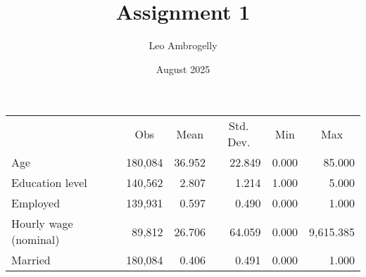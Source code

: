 \documentclass{article}
\title{Assignment 1}
\author{Leo Ambrogelly}
\date{August 2025}
\begin{document}
\maketitle

\begin{table}[!h]
\centering
\begin{tabular}{llllll}
\cline{1-6}
\multicolumn{1}{r}{} &
  \multicolumn{1}{c}{Obs} &
  \multicolumn{1}{c}{Mean} &
  \multicolumn{1}{c}{Std. Dev.} &
  \multicolumn{1}{c}{Min} &
  \multicolumn{1}{c}{Max} \\
\cline{1-6}
\multicolumn{1}{l}{Age} &
  \multicolumn{1}{r}{180,084} &
  \multicolumn{1}{r}{36.952} &
  \multicolumn{1}{r}{22.849} &
  \multicolumn{1}{r}{0.000} &
  \multicolumn{1}{r}{85.000} \\
\multicolumn{1}{l}{Education level} &
  \multicolumn{1}{r}{140,562} &
  \multicolumn{1}{r}{2.807} &
  \multicolumn{1}{r}{1.214} &
  \multicolumn{1}{r}{1.000} &
  \multicolumn{1}{r}{5.000} \\
\multicolumn{1}{l}{Employed} &
  \multicolumn{1}{r}{139,931} &
  \multicolumn{1}{r}{0.597} &
  \multicolumn{1}{r}{0.490} &
  \multicolumn{1}{r}{0.000} &
  \multicolumn{1}{r}{1.000} \\
\multicolumn{1}{l}{Hourly wage (nominal)} &
  \multicolumn{1}{r}{89,812} &
  \multicolumn{1}{r}{26.706} &
  \multicolumn{1}{r}{64.059} &
  \multicolumn{1}{r}{0.000} &
  \multicolumn{1}{r}{9,615.385} \\
\multicolumn{1}{l}{Married} &
  \multicolumn{1}{r}{180,084} &
  \multicolumn{1}{r}{0.406} &
  \multicolumn{1}{r}{0.491} &
  \multicolumn{1}{r}{0.000} &
  \multicolumn{1}{r}{1.000} \\
\cline{1-6}
\end{tabular}
\end{table}
\end{document}

